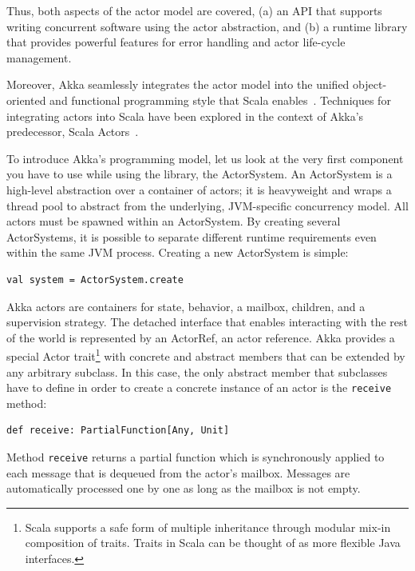 \documentclass{sig-alternate}
\begin{document}
Thus, both aspects of the actor model are covered, (a) an API that supports writing concurrent software using the actor abstraction, and (b) a runtime library that provides powerful features for error handling and actor life-cycle management.

Moreover, Akka seamlessly integrates the actor model into the unified object-oriented and functional programming style
that Scala enables~\cite{OderskyR14}. Techniques for integrating actors into Scala have been explored in the context of Akka's predecessor, Scala Actors~\cite{HallerO09}.

To introduce Akka's programming model, let us look at the very first component you have to use while using the library, the ActorSystem.
An ActorSystem is a high-level abstraction over a container of actors; it is heavyweight and wraps a thread pool to abstract from the underlying, JVM-specific concurrency model.
All actors must be spawned within an ActorSystem. By creating several ActorSystems, it is possible to separate different runtime requirements even within the same JVM process.
Creating a new ActorSystem is simple:
\begin{lstlisting}
val system = ActorSystem.create
\end{lstlisting}
\noindent
Akka actors are containers for state, behavior, a mailbox, children, and a supervision strategy. The detached interface that enables interacting with the rest of the world is represented by an ActorRef, an actor reference.
Akka provides a special Actor trait\footnote{Scala supports a safe form of multiple inheritance through modular mix-in composition of traits. Traits in Scala can be thought of as more flexible Java interfaces.} with concrete and abstract members that can be extended by any arbitrary subclass.
In this case, the only abstract member that subclasses have to define in order to create a concrete instance of an actor is the \verb|receive| method:
\begin{lstlisting}
def receive: PartialFunction[Any, Unit]
\end{lstlisting}
\noindent
Method \verb|receive| returns a partial function which is synchronously applied to each message that is dequeued from the actor's mailbox. Messages are automatically processed one by one as long as the mailbox is not empty.
\end{document}
